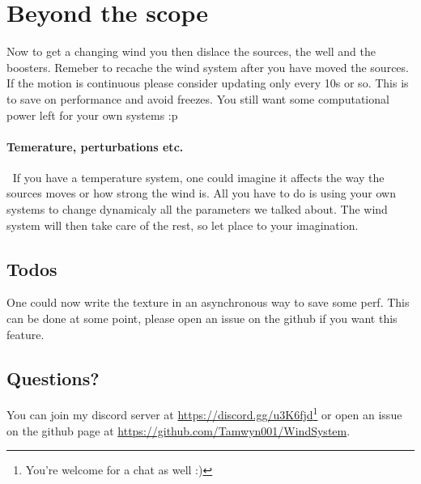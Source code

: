 \documentclass[../main.tex]{subfile}
\begin{document}
\section{Beyond the scope}
    Now to get a changing wind you then dislace the sources, the well and the boosters. Remeber to recache the wind system after you have moved the sources. If the motion is
    continuous please consider updating only every 10s or so. This is to save on performance and avoid freezes. You still want some computational power left 
    for your own systems :p\\

    \paragraph{Temerature, perturbations etc.} $~$ If you have a temperature system, one could imagine it affects the way the sources moves or how strong the wind is. All
    you have to do is using your own systems to change dynamicaly all the parameters we talked about. The wind system will then take care of the rest,
     so let place to your imagination.\\

     \subsection{Todos} 
     One could now write the texture in an asynchronous way to save some perf. This can be done at some point, please open an issue on the github if you want this feature.\\

     \subsection{Questions?}
     You can join my discord server at \url{https://discord.gg/u3K6fjd}\footnote{You're welcome for a chat as well :)} or open an issue on the github page at \url{https://github.com/Tamwyn001/WindSystem}.\\
\end{document}
